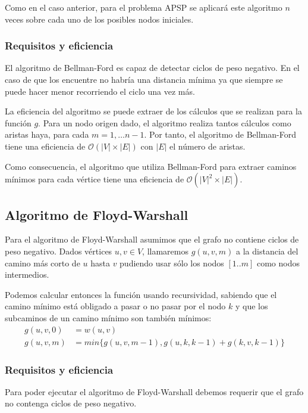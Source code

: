 \documentclass[a4paper, 11pt]{article} %
\begin{document}
    Como en el caso anterior, para el problema APSP se aplicará este algoritmo $n$ veces sobre cada uno
    de los posibles nodos iniciales.

    \subsubsection{Requisitos y eficiencia}
      El algoritmo de Bellman-Ford es capaz de detectar ciclos de peso negativo. En el caso de que los encuentre 
      no habría una distancia mínima ya que siempre se puede hacer menor recorriendo el ciclo una vez más.
      
      La eficiencia del algoritmo se puede extraer de los cálculos que se realizan para la función $g$. 
      Para un nodo origen dado, el algoritmo realiza tantos cálculos como aristas haya, para cada 
      $m = 1,\dots n-1$. Por tanto, el algoritmo de Bellman-Ford tiene una eficiencia de 
      $\mathcal{O}(|V|\times |E|)$ con $|E|$ el número de aristas.
      
      Como consecuencia, el algoritmo que utiliza Bellman-Ford para extraer caminos mínimos para cada 
      vértice tiene una eficiencia de $\mathcal{O}(|V|^2\times |E|)$.
      
      
    \subsection{Algoritmo de Floyd-Warshall}
      Para el algoritmo de Floyd-Warshall asumimos que el grafo no contiene ciclos de peso negativo.
      Dados vértices $u,v \in V$, llamaremos $g(u,v,m)$ a la distancia del camino más corto de $u$
      hasta $v$ pudiendo usar sólo los nodos $[1..m]$ como nodos intermedios.
      
      Podemos calcular entonces la función usando recursividad, sabiendo que el
      camino mínimo está obligado a pasar o no pasar por el nodo $k$ y que los
      subcaminos de un camino mínimo son también mínimos:
      \begin{equation}
	\begin{split}
	g(u,v,0) &= w(u,v) \\
	g(u,v,m) &= min\{g(u,v,m-1), g(u,k,k-1)+g(k,v,k-1)\}
	\end{split}
      \end{equation}
    
    
    \subsubsection{Requisitos y eficiencia}
      Para poder ejecutar el algoritmo de Floyd-Warshall debemos requerir que el grafo
      no contenga ciclos de peso negativo.
      
\end{document}
